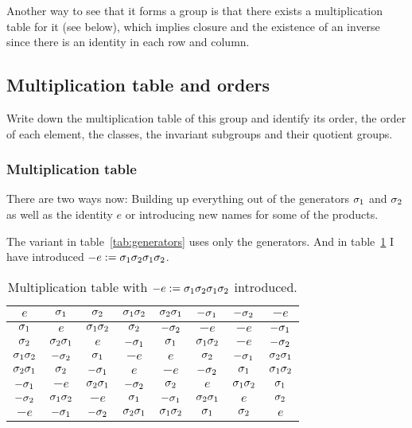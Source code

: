 \documentclass[11pt, english, fleqn, DIV=15, headinclude, BCOR=1cm]{scrartcl}
\begin{document}
Another way to see that it forms a group is that there exists a multiplication
table for it (see below), which implies closure and the existence of an inverse
since there is an identity in each row and column.

\subsection{Multiplication table and orders}

\begin{problem}
    Write down the multiplication table of this group and identify its order,
    the order of each element, the classes, the invariant subgroups and their
    quotient groups.
\end{problem}

\subsubsection{Multiplication table}

There are two ways now: Building up everything out of the generators $\sigma_1$ and
$\sigma_2$ as well as the identity $e$ or introducing new names for some of the
products.

The variant in table~\ref{tab:generators} uses only the generators. And in
table~\ref{tab:symbols} I have introduced $-e := \sigma_1\sigma_2\sigma_1\sigma_2$.

\begin{table}[htbp]
    \centering
    \begin{tabular}{c|ccccccc}
        $e$ & $\sigma_1$ & $\sigma_2$ & $\sigma_1\sigma_2$ & $\sigma_2\sigma_1$ & $-\sigma_1$ & $-\sigma_2$ & $-e$ \\
        \midrule
        $\sigma_1$ & $e$ & $\sigma_1\sigma_2$ & $\sigma_2$ & $-\sigma_2$ & $-e$ & $-e$ & $-\sigma_1$ \\
        $\sigma_2$ & $\sigma_2\sigma_1$ & $e$ & $-\sigma_1$ & $\sigma_1$ & $\sigma_1\sigma_2$ & $-e$ & $-\sigma_2$ \\
        $\sigma_1\sigma_2$ & $-\sigma_2$ & $\sigma_1$ & $-e$ & $e$ & $\sigma_2$ & $-\sigma_1$ & $\sigma_2\sigma_1$ \\
        $\sigma_2\sigma_1$ & $\sigma_2$ & $-\sigma_1$ & $e$ & $-e$ & $-\sigma_2$ & $\sigma_1$ & $\sigma_1\sigma_2$ \\
        $-\sigma_1$ & $-e$ & $\sigma_2\sigma_1$ & $-\sigma_2$ & $\sigma_2$ & $e$ & $\sigma_1\sigma_2$ & $\sigma_1$ \\
        $-\sigma_2$ & $\sigma_1\sigma_2$ & $-e$ & $\sigma_1$ & $-\sigma_1$ & $\sigma_2\sigma_1$ & $e$ & $\sigma_2$ \\
        $-e$ & $-\sigma_1$ & $-\sigma_2$ & $\sigma_2\sigma_1$ & $\sigma_1\sigma_2$ & $\sigma_1$ & $\sigma_2$ & $e$ \\
    \end{tabular}
    \caption{%
        Multiplication table with $-e := \sigma_1\sigma_2\sigma_1\sigma_2$ introduced.
    }
    \label{tab:symbols}
\end{table}
\end{document}
